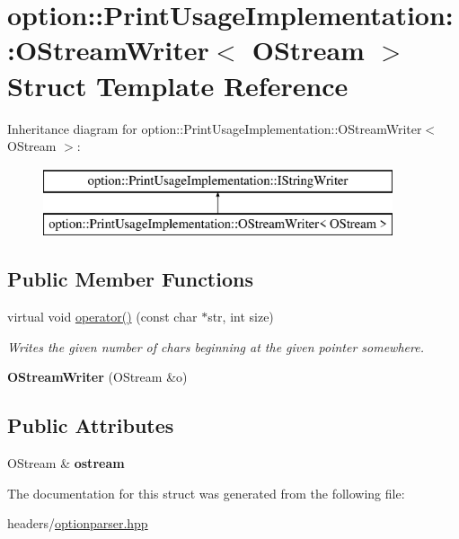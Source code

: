 \hypertarget{structoption_1_1PrintUsageImplementation_1_1OStreamWriter}{}\section{option\+:\+:Print\+Usage\+Implementation\+:\+:O\+Stream\+Writer$<$ O\+Stream $>$ Struct Template Reference}
\label{structoption_1_1PrintUsageImplementation_1_1OStreamWriter}
Inheritance diagram for option\+:\+:Print\+Usage\+Implementation\+:\+:O\+Stream\+Writer$<$ O\+Stream $>$\+:\begin{figure}[H]
\begin{center}
\leavevmode
\includegraphics[height=2.000000cm]{structoption_1_1PrintUsageImplementation_1_1OStreamWriter}
\end{center}
\end{figure}
\subsection*{Public Member Functions}
\begin{DoxyCompactItemize}
\item 
\mbox{\label{structoption_1_1PrintUsageImplementation_1_1OStreamWriter_a323890fba123ad476fa2471029fc7b23}} 
virtual void \hyperlink{structoption_1_1PrintUsageImplementation_1_1OStreamWriter_a323890fba123ad476fa2471029fc7b23}{operator()} (const char $\ast$str, int size)
\begin{DoxyCompactList}\small\item\em Writes the given number of chars beginning at the given pointer somewhere. \end{DoxyCompactList}\item 
\mbox{\label{structoption_1_1PrintUsageImplementation_1_1OStreamWriter_abf38eb181267e96d86de1ea09ad22c3f}} 
{\bfseries O\+Stream\+Writer} (O\+Stream \&o)
\end{DoxyCompactItemize}
\subsection*{Public Attributes}
\begin{DoxyCompactItemize}
\item 
\mbox{\label{structoption_1_1PrintUsageImplementation_1_1OStreamWriter_a9b808696e204a834acd4362c62b9f4c1}} 
O\+Stream \& {\bfseries ostream}
\end{DoxyCompactItemize}


The documentation for this struct was generated from the following file\+:\begin{DoxyCompactItemize}
\item 
headers/\hyperlink{optionparser_8hpp}{optionparser.\+hpp}\end{DoxyCompactItemize}
